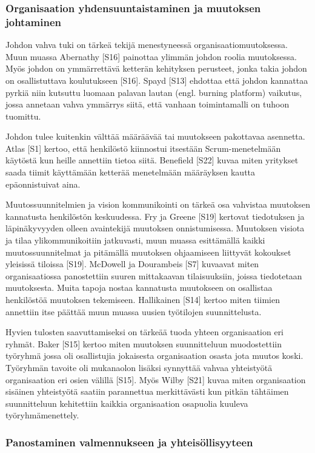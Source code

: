 \subsubsection{Organisaation yhdensuuntaistaminen ja muutoksen johtaminen}

Johdon vahva tuki on tärkeä tekijä menestyneessä organisaatiomuutoksessa.
Muun muassa Abernathy [S16] painottaa ylimmän johdon roolia muutoksessa. Myös
johdon on ymmärrettävä ketterän kehityksen perusteet, jonka takia johdon on
osallistuttava koulutukseen [S16]. Spayd [S13] ehdottaa että johdon kannattaa
pyrkiä niin kutsuttu luomaan palavan lautan (engl. burning platform) vaikutus,
jossa annetaan vahva ymmärrys siitä, että vanhaan toimintamalli on tuhoon
tuomittu.

Johdon tulee kuitenkin välttää määräävää tai muutokseen pakottavaa asennetta.
Atlas [S1] kertoo, että henkilöstö kiinnostui itsestään Scrum-menetelmään
käytöstä kun heille annettiin tietoa siitä. Benefield [S22] kuvaa miten
yritykset saada tiimit käyttämään ketterää menetelmään määräyksen kautta
epäonnistuivat aina.

Muutossuunnitelmien ja vision kommunikointi on tärkeä osa vahvistaa muutoksen
kannatusta henkilöstön keskuudessa. Fry ja Greene [S19] kertovat tiedotuksen ja
läpinäkyvyyden olleen avaintekijä muutoksen onnistumisessa. Muutoksen visiota ja
tilaa ylikommunikoitiin jatkuvasti, muun muassa esittämällä kaikki
muutossuunnitelmat ja pitämällä muutoksen ohjaamiseen liittyvät kokoukset
yleisissä tiloissa [S19]. McDowell ja Dourambeis [S7] kuvaavat miten
organisaatiossa panostettiin suuren mittakaavan tilaisuuksiin, joissa
tiedotetaan muutoksesta. Muita tapoja nostaa kannatusta muutokseen on osallistaa
henkilöstöä muutoksen tekemiseen. Hallikainen [S14] kertoo miten tiimien
annettiin itse päättää muun muassa uusien työtilojen suunnittelusta.

Hyvien tulosten saavuttamiseksi on tärkeää tuoda yhteen organisaation eri
ryhmät. Baker [S15] kertoo miten muutoksen suunnitteluun muodostettiin työryhmä
jossa oli osallistujia jokaisesta organisaation osasta jota muutos koski.
Työryhmän tavoite oli mukanaolon lisäksi synnyttää vahvaa yhteistyötä
organisaation eri osien välillä [S15]. Myös Wilby [S21] kuvaa miten
organisaation sisäinen yhteistyötä saatiin parannettua merkittävästi kun pitkän
tähtäimen suunnitteluun kehitettiin kaikkia organisaation osapuolia kuuleva
työryhmämenettely.

\subsubsection{Panostaminen valmennukseen ja yhteisöllisyyteen}

